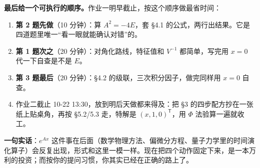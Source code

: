 \documentclass[11pt]{ctexart}
\begin{document}
\textbf{最后给一个可执行的顺序。}作业一明早截止，按这个顺序做最省时间：

\begin{enumerate}[label=(\arabic*)]
\item \textbf{第 2 题先做}（10 分钟）：算 $A^2=-4E$，套 §4.1 的公式，两行出结果。它是四道题里唯一“看一眼就能确认对错”的。
\item \textbf{第 1 题次之}（20 分钟）：对角化路线，特征值和 $V^{-1}$ 都简单，写完用 $x=0$ 代一下自查是不是 $E$。
\item \textbf{第 3 题最后}（20 分钟）：§4.2 的级联，三次积分因子，做完同样用 $x=0$ 自查。
\item 作业二截止 10-22 13:30，放到明后天做都来得及：把 §3 的四步配方抄在一张纸上贴桌角，再按 §5.2/5.3 走，特解是 $(x,1,0)^{\mathsf T}$，用 $\Phi$ 法验算一遍就收工。
\end{enumerate}

\textbf{一句实话}：$e^{Ax}$ 这件事在后面（数学物理方法、偏微分方程、量子力学里的时间演化算子）会反复出现，形式和这里一模一样。现在把四个动作固定下来，是一本万利的投资；而按你的提问习惯，你其实已经在正确的路上了。
\end{document}
